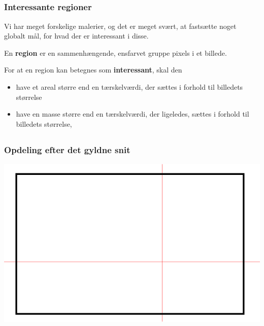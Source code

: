 \documentclass[xcolor=table]{beamer}
\begin{document}
\subsection*{}
\begin{frame}

    \frametitle{Interessante regioner}

    Vi har meget forskelige malerier, og det er meget svært, at fastsætte noget globalt mål, for
    hvad der er interessant i disse.

    \begin{definition}
        En \textbf{region} er en sammenhængende, ensfarvet gruppe pixels i
        et billede.
    \end{definition}

    \begin{definition}
        For at en region kan betegnes som \textbf{interessant}, skal den
        \begin{itemize}
            \item have et areal større end en tærskelværdi, der sættes i
                forhold til billedets størrelse
            \item have en masse større end en tærskelværdi, der ligeledes,
                sættes i forhold til billedets størrelse,
        \end{itemize}
    \end{definition}

\end{frame}

\subsection*{}
\begin{frame}

    \frametitle{Opdeling efter det gyldne snit}

    \includegraphics[width=\textwidth]{billeder/scan_direction.png}

\end{frame}
\end{document}
